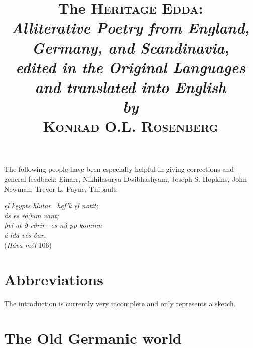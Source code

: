 \title{%
  \Huge The \textsc{Heritage Edda}: \\
  \huge\emph{Alliterative Poetry from England, Germany, and Scandinavia}, \\
  \large\emph{edited in the Original Languages and translated into English} \\
  \large\emph{by} \\
  \huge \textsc{Konrad O.L. Rosenberg}
}

\maketitle

\newpage\thispagestyle{empty}

\begin{center} The following people have been especially helpful in giving corrections and general feedback: Ęinarr, Nikhilasurya Dwibhashyam, Joseph S. Hopkins, John Newman, Trevor L. Payne, Thibault.\end{center}

\newpage\thispagestyle{empty}

\begin{center}{\large \emph{ęl kęypts hlutar \hld\ hęf’k ęl notit; \\
ás es róðum vant; \\
því-at ð-rǿrir \hld\ es nú pp kominn \\
á lda vés ðar.}} \\

(\emph{Háva mǫ́l} 106)\end{center}

\newpage\thispagestyle{empty}

\tableofcontents

\newpage

\thispagestyle{empty}\section{Abbreviations}

\newpage


The introduction is currently very incomplete and only represents a sketch.

\section{The Old Germanic world}

